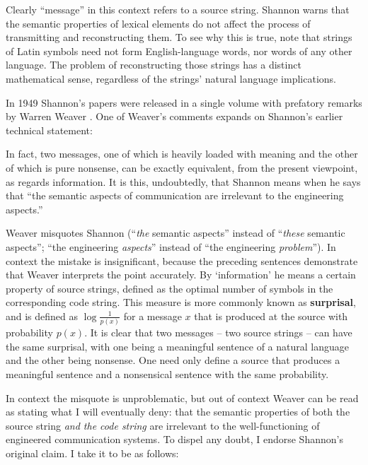 \documentclass[12pt]{article}
\begin{document}
\noindent Clearly ``message'' in this context refers to a source string.
Shannon warns that the semantic properties of lexical elements do not affect the process of transmitting and reconstructing them.
To see why this is true, note that strings of Latin symbols need not form English-language words, nor words of any other language.
The problem of reconstructing those strings has a distinct mathematical sense, regardless of the strings' natural language implications.

In 1949 Shannon's papers were released in a single volume with prefatory remarks by Warren Weaver \citep{shannon1949mathematical}.
One of Weaver's comments expands on Shannon's earlier technical statement:

\begin{myquote}
In fact, two messages, one of which is heavily loaded with meaning and the other of which is pure nonsense, can be exactly equivalent, from the present viewpoint, as regards information. It is this, undoubtedly, that Shannon means when he says that ``the semantic aspects of communication are irrelevant to the engineering aspects.''
\par\hspace*{\fill}\citet[8]{shannon1949mathematical}
\end{myquote}

\noindent Weaver misquotes Shannon (``\emph{the} semantic aspects'' instead of ``\emph{these} semantic aspects''; ``the engineering \textit{aspects}'' instead of ``the engineering \textit{problem}'').
In context the mistake is insignificant, because the preceding sentences demonstrate that Weaver interprets the point accurately.
By `information' he means a certain property of source strings, defined as the optimal number of symbols in the corresponding code string.
This measure is more commonly known as \textbf{surprisal}, and is defined as $\log{\frac{1}{p(x)}}$ for a message $x$ that is produced at the source with probability $p(x)$.
It is clear that two messages -- two source strings -- can have the same surprisal, with one being a meaningful sentence of a natural language and the other being nonsense.
One need only define a source that produces a meaningful sentence and a nonsensical sentence with the same probability.

In context the misquote is unproblematic, but out of context Weaver can be read as stating what I will eventually deny: that the semantic properties of both the source string \textit{and the code string} are irrelevant to the well-functioning of engineered communication systems.
To dispel any doubt, I endorse Shannon's original claim.
I take it to be as follows:
\end{document}
